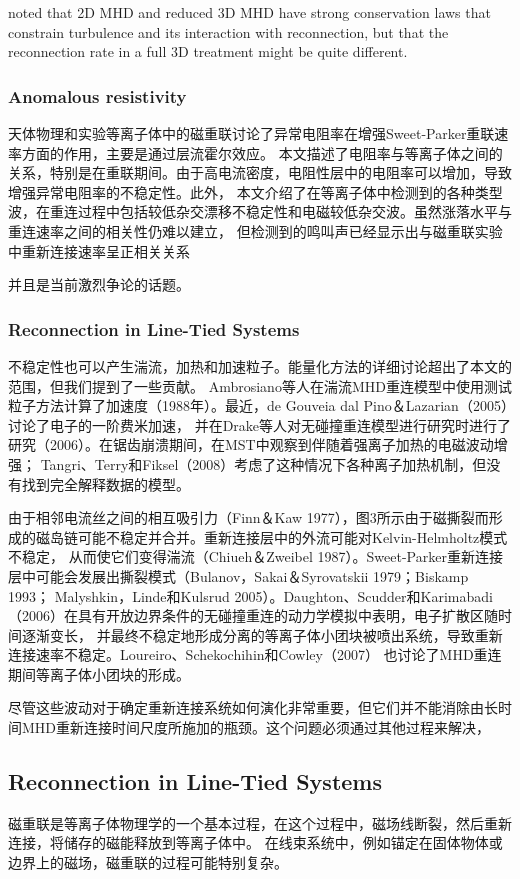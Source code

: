 \documentclass[12pt, a4paper, oneside]{article}
\begin{document}
\begin{spacing}{2.0}
noted that 2D MHD and reduced 3D MHD have
strong conservation laws that constrain turbulence and its interaction with reconnection, but that
the reconnection rate in a full 3D treatment might be quite different.


\subsubsection{Anomalous resistivity}
天体物理和实验等离子体中的磁重联讨论了异常电阻率在增强Sweet-Parker重联速率方面的作用，主要是通过层流霍尔效应。
本文描述了电阻率与等离子体之间的关系，特别是在重联期间。由于高电流密度，电阻性层中的电阻率可以增加，导致增强异常电阻率的不稳定性。此外，
本文介绍了在等离子体中检测到的各种类型波，在重连过程中包括较低杂交漂移不稳定性和电磁较低杂交波。虽然涨落水平与重连速率之间的相关性仍难以建立，
但检测到的鸣叫声已经显示出与磁重联实验中重新连接速率呈正相关关系

并且是当前激烈争论的话题。
\subsubsection{Reconnection in Line-Tied Systems}
不稳定性也可以产生湍流，加热和加速粒子。能量化方法的详细讨论超出了本文的范围，但我们提到了一些贡献。
Ambrosiano等人在湍流MHD重连模型中使用测试粒子方法计算了加速度（1988年）。最近，de Gouveia dal Pino＆Lazarian（2005）讨论了电子的一阶费米加速，
并在Drake等人对无碰撞重连模型进行研究时进行了研究（2006）。在锯齿崩溃期间，在MST中观察到伴随着强离子加热的电磁波动增强；
Tangri、Terry和Fiksel（2008）考虑了这种情况下各种离子加热机制，但没有找到完全解释数据的模型。

由于相邻电流丝之间的相互吸引力（Finn＆Kaw 1977），图3所示由于磁撕裂而形成的磁岛链可能不稳定并合并。重新连接层中的外流可能对Kelvin-Helmholtz模式不稳定，
从而使它们变得湍流（Chiueh＆Zweibel 1987）。Sweet-Parker重新连接层中可能会发展出撕裂模式（Bulanov，Sakai＆Syrovatskii 1979；Biskamp 1993；
Malyshkin，Linde和Kulsrud 2005）。Daughton、Scudder和Karimabadi（2006）在具有开放边界条件的无碰撞重连的动力学模拟中表明，电子扩散区随时间逐渐变长，
并最终不稳定地形成分离的等离子体小团块被喷出系统，导致重新连接速率不稳定。Loureiro、Schekochihin和Cowley（2007）
也讨论了MHD重连期间等离子体小团块的形成。

尽管这些波动对于确定重新连接系统如何演化非常重要，但它们并不能消除由长时间MHD重新连接时间尺度所施加的瓶颈。这个问题必须通过其他过程来解决，
\subsection{Reconnection in Line-Tied Systems}
磁重联是等离子体物理学的一个基本过程，在这个过程中，磁场线断裂，然后重新连接，将储存的磁能释放到等离子体中。
在线束系统中，例如锚定在固体物体或边界上的磁场，磁重联的过程可能特别复杂。


\end{spacing}
\end{document}
